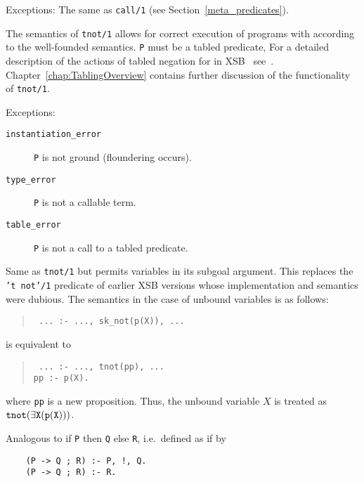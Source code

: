 \begin{description}
    Exceptions: The same as {\tt call/1} 
		(see Section~\ref{meta_predicates}).

\label{tnot/1}
    The semantics of {\tt tnot/1} allows for correct execution of
    programs with according to the well-founded semantics.  {\tt P}
    must be a tabled predicate, 
%
% 
%
    For a detailed description of the actions of tabled negation for
    in XSB \version\ see~\cite{SaSw98, SaSW96}.
    Chapter~\ref{chap:TablingOverview} contains further discussion of the
    functionality of {\tt tnot/1}.

    Exceptions:
    \begin{description}
    \item[{\tt instantiation\_error}]
	{\tt P} is not ground (floundering occurs).
    \item[{\tt type\_error}]
	{\tt P} is not a callable term.
    \item[{\tt table\_error}]
	{\tt P} is not a call to a tabled predicate.
    \end{description}

    
    Same as {\tt tnot/1} but permits variables in its subgoal argument.
    This replaces the {\tt 't not'/1} predicate of earlier XSB versions
    whose implementation and semantics were dubious. The semantics in the
    case of unbound variables is as follows:
    \begin{quote}
      \tt
      ... :- ...,~sk\_not(p(X)),~...
    \end{quote}
    is equivalent to
    \begin{quote}
      \tt
      ... :- ..., tnot(pp),~...\\
      pp :- p(X).
    \end{quote}
    where {\tt pp} is a new proposition. Thus, the unbound variable $X$ is
    treated as $\tt tnot(\exists X (p(X)))$.

    Analogous to if {\tt P} then {\tt Q} else {\tt R}, i.e.\ defined as 
    if by
	\begin{center}
	\begin{minipage}{2.10in}
	\begin{verbatim}
	(P -> Q ; R) :- P, !, Q.
	(P -> Q ; R) :- R.
	\end{verbatim}
	\end{minipage}
	\end{center}


\end{description}
